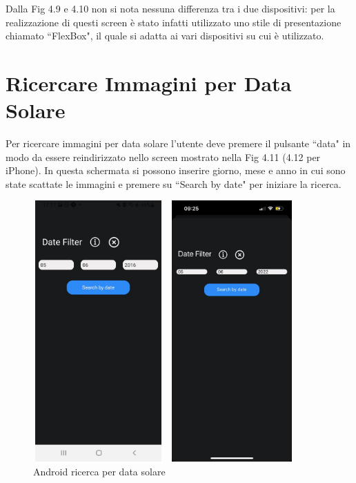 Dalla Fig 4.9 e 4.10 non si nota nessuna differenza tra i due dispositivi: per la realizzazione di questi screen \`e stato infatti utilizzato uno stile di
presentazione chiamato ``FlexBox", il quale si adatta ai vari dispositivi su cui \`e utilizzato.

\section{Ricercare Immagini per Data Solare}
Per ricercare immagini per data solare l'utente deve premere il pulsante ``data" in modo da essere reindirizzato nello screen mostrato nella Fig 4.11 (4.12 per iPhone).
In questa schermata si possono inserire giorno, mese e anno in cui sono state scattate le immagini e premere su ``Search by date" per iniziare la ricerca.
\begin{figure}[h]
    \begin{minipage}[h]{0.47\textwidth}
        \centering
        \includegraphics[width=5cm, height=10cm]{images/immaginiAndroid/SearchbyDate.jpg}
        \caption{\label{SearchbyDateAndroid} Android ricerca per data solare}
    \end{minipage}
    \hfill
    \begin{minipage}[h]{0.47\textwidth}
        \centering
        \includegraphics[width=5cm, height=10cm]{images/immaginiPhone/SearchbyDate.jpeg}

\end{minipage}
\end{figure}
